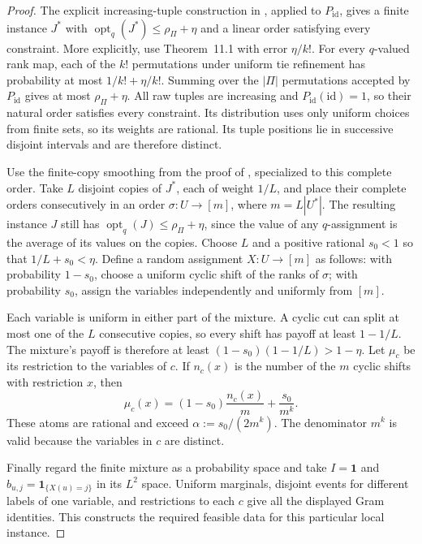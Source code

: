 \begin{proof}
The explicit increasing-tuple construction in
\cite[Theorem~11.1, Definition~11.2, and the proof of
Theorem~2.5]{GuruswamiEtAl2011OrderingCSP}, applied to \(P_{\mathrm{id}}\),
gives a finite instance \(J^*\) with
\(\operatorname{opt}_q(J^*)\le\rho_\Pi+\eta\) and a linear order
satisfying every constraint.  More explicitly, use Theorem~11.1 with
error \(\eta/k!\).  For every \(q\)-valued rank map, each of the
\(k!\) permutations under uniform tie refinement has probability at
most \(1/k!+\eta/k!\).  Summing over the \(|\Pi|\) permutations
accepted by \(P_{\mathrm{id}}\) gives at most \(\rho_\Pi+\eta\).
All raw tuples are increasing and \(P_{\mathrm{id}}(\mathrm{id})=1\), so their
natural order satisfies every constraint.
Its distribution uses only uniform
choices from finite sets, so its weights are rational.  Its tuple
positions lie in successive disjoint intervals and are therefore
distinct.

Use the finite-copy smoothing from the proof of
\cite[Lemma~8.9]{GuruswamiEtAl2011OrderingCSP}, specialized to this
complete order.  Take \(L\) disjoint copies of \(J^*\), each of weight
\(1/L\), and place their complete orders consecutively in an order
\(\sigma:U\to[m]\), where \(m=L|U^*|\).  The resulting instance \(J\)
still has \(\operatorname{opt}_q(J)\le\rho_\Pi+\eta\), since the value
of any \(q\)-assignment is the average of its values on the copies.
Choose \(L\) and a positive rational \(s_0<1\) so that
\(1/L+s_0<\eta\).  Define a random assignment \(X:U\to[m]\) as
follows: with probability \(1-s_0\), choose a uniform cyclic shift
of the ranks of \(\sigma\); with probability \(s_0\), assign the
variables independently and uniformly from \([m]\).

Each variable is uniform in either part of the mixture.  A cyclic
cut can split at most one of the \(L\) consecutive copies, so every
shift has payoff at least \(1-1/L\).  The mixture's payoff is
therefore at least
\((1-s_0)(1-1/L)>1-\eta\).  Let \(\mu_c\) be its restriction to the
variables of \(c\).  If \(n_c(x)\) is the number of the \(m\) cyclic
shifts with restriction \(x\), then
\[
 \mu_c(x)=(1-s_0)\frac{n_c(x)}m+\frac{s_0}{m^k}.
\]
These atoms are rational and exceed
\(\alpha:=s_0/(2m^k)\).  The denominator \(m^k\) is valid because
the variables in \(c\) are distinct.

Finally regard the finite mixture as a probability space and take
\(I=\mathbf1\) and \(b_{u,j}=\mathbf1_{\{X(u)=j\}}\) in its
\(L^2\) space.  Uniform marginals, disjoint events for different
labels of one variable, and restrictions to each \(c\) give all the
displayed Gram identities.  This constructs the required feasible
data for this particular local instance.
\end{proof}

